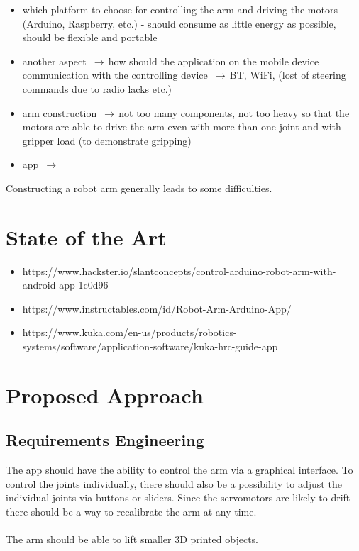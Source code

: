 \documentclass[conference]{IEEEtran}
\newcommand{\arrowright}{$\,\to\,$}
\begin{document}
\begin{itemize}
	\item which platform to choose for controlling the  arm and driving the motors (Arduino, Raspberry, etc.) - should consume as little energy as possible,  should be flexible and portable
	\item another aspect \arrowright how should the application on the mobile device communication with the controlling device \arrowright BT, WiFi, (lost of steering commands due to radio lacks etc.)
	\item arm construction \arrowright not too many components, not too heavy so that the motors are able to drive the arm even with more than one joint and with gripper load (to demonstrate gripping)
	\item app \arrowright 
\end{itemize}
Constructing a robot arm generally leads to some difficulties.

\section{State of the Art}

\begin{itemize}
	\item https://www.hackster.io/slantconcepts/control-arduino-robot-arm-with-android-app-1c0d96
	\item https://www.instructables.com/id/Robot-Arm-Arduino-App/
	\item https://www.kuka.com/en-us/products/robotics-systems/software/application-software/kuka-hrc-guide-app
\end{itemize}

\section{Proposed Approach}\label{sec:approach}

\subsection{Requirements Engineering}\label{sec:requirements}
The app should have the ability to control the arm via a graphical interface. To control the joints individually, there should also be a possibility to adjust the individual joints via buttons or sliders. Since the servomotors are likely to drift there should be a way to recalibrate the arm at any time.
\\\\
The arm should be able to lift smaller 3D printed objects.
\end{document}
